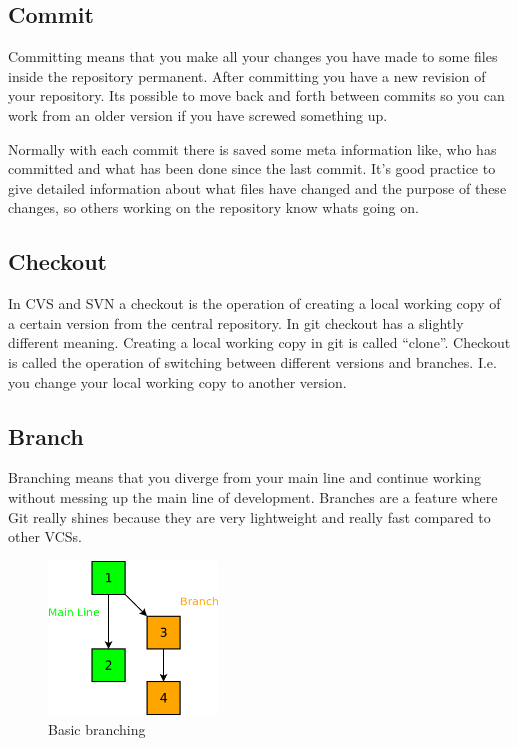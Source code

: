 \subsection{Commit}

Committing means that you make all your changes you have made to some files inside the repository permanent. 
After committing you have a new revision of your repository. Its possible to move back and forth between commits so you can work 
from an older version if you have screwed something up.

Normally with each commit there is saved some meta information like, who has committed and what has been done since the last commit. 
It's good practice to give detailed information about what files have changed and the purpose of these changes, so others working 
on the repository know whats going on.


\subsection{Checkout}

In CVS and SVN a checkout is the operation of creating a local working copy of a certain version from the 
central repository. In git checkout has a slightly different meaning. Creating a local working copy in git is 
called “clone”. \cite[Chapter 2.1]{gitpro2009} Checkout is called the operation of switching between different versions and branches. I.e. 
you change your local working copy to another version. \cite[Chapter 3.2]{gitpro2009}


\subsection{Branch}

Branching means that you diverge from your main line and continue working without messing up the main line of 
development. Branches are a feature where Git really shines because they are very lightweight and really fast compared to other VCSs. \cite[Chapter 3]{gitpro2009}

\begin{figure}[ht]
  \centering
  \includegraphics[width=0.4\textwidth]{img/Gen_Branch}
  \caption{Basic branching}
  \label{fig:gen_branch} 
\end{figure}

